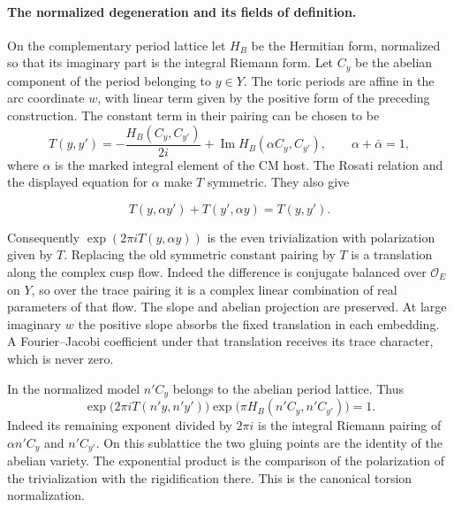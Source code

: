 \paragraph{The normalized degeneration and its fields of definition.}
On the complementary period lattice let \(H_B\) be the Hermitian
form, normalized so that its imaginary part is the integral Riemann
form. Let \(C_y\) be the abelian component of the period belonging
to \(y\in Y\). The toric periods are affine in the arc coordinate
\(w\), with linear term given by the positive form of the preceding
construction. The constant term in their pairing can be chosen to be
\begin{equation}\label{eq:slice-cm-normal-pairing}
 T(y,y')=-\frac{H_B(C_y,C_{y'})}{2i}
                 +\operatorname{Im}H_B(\alpha C_y,C_{y'}),
 \qquad \alpha+\bar\alpha=1,
\end{equation}
where \(\alpha\) is the marked integral element of the CM host.
The Rosati relation and the displayed equation for \(\alpha\)
make \(T\) symmetric. They also give

\[
  T(y,\alpha y')+T(y',\alpha y)=T(y,y').
\]

Consequently \(\exp(2\pi i T(y,\alpha y))\) is the even
trivialization with polarization given by \(T\).
Replacing the old symmetric constant pairing by \(T\) is a
translation along the complex cusp flow. Indeed the difference
is conjugate balanced over \(\mathcal O_E\) on \(Y\), so over
the trace pairing it is a complex linear combination of real
parameters of that flow. The slope and abelian projection are
preserved. At large imaginary \(w\) the positive slope absorbs
the fixed translation in each embedding. A Fourier--Jacobi
coefficient under that translation receives its trace character,
which is never zero.

In the normalized model \(n'C_y\) belongs
to the abelian period lattice. Thus
\begin{equation}\label{eq:slice-cm-tau-normal}
  \exp\bigl(2\pi i T(n'y,n'y')\bigr)
       \exp\bigl(\pi H_B(n'C_y,n'C_{y'})\bigr)=1.
\end{equation}
Indeed its remaining exponent divided by \(2\pi i\) is the
integral Riemann pairing of \(\alpha n'C_y\) and \(n'C_{y'}\).
On this sublattice the two gluing points are the identity of the
abelian variety. The exponential product is the comparison of
the polarization of the trivialization with the rigidification
there. This is the canonical torsion normalization.
\label{cor:slice-cm-arc-model-1}

